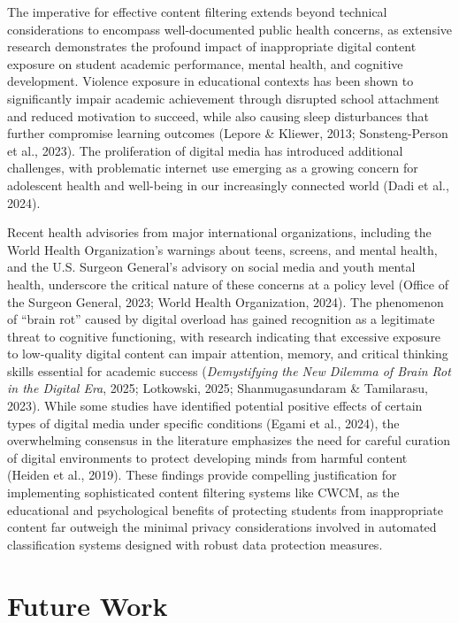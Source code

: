 \documentclass[
  titlepage]{article}
\begin{document}
The imperative for effective content filtering extends beyond technical
considerations to encompass well-documented public health concerns, as
extensive research demonstrates the profound impact of inappropriate
digital content exposure on student academic performance, mental health,
and cognitive development. Violence exposure in educational contexts has
been shown to significantly impair academic achievement through
disrupted school attachment and reduced motivation to succeed, while
also causing sleep disturbances that further compromise learning
outcomes (Lepore \& Kliewer, 2013; Sonsteng-Person et al., 2023). The
proliferation of digital media has introduced additional challenges,
with problematic internet use emerging as a growing concern for
adolescent health and well-being in our increasingly connected world
(Dadi et al., 2024).

Recent health advisories from major international organizations,
including the World Health Organization's warnings about teens, screens,
and mental health, and the U.S. Surgeon General's advisory on social
media and youth mental health, underscore the critical nature of these
concerns at a policy level (Office of the Surgeon General, 2023; World
Health Organization, 2024). The phenomenon of ``brain rot'' caused by
digital overload has gained recognition as a legitimate threat to
cognitive functioning, with research indicating that excessive exposure
to low-quality digital content can impair attention, memory, and
critical thinking skills essential for academic success
(\emph{Demystifying the New Dilemma of Brain Rot in the Digital Era},
2025; Lotkowski, 2025; Shanmugasundaram \& Tamilarasu, 2023). While some
studies have identified potential positive effects of certain types of
digital media under specific conditions (Egami et al., 2024), the
overwhelming consensus in the literature emphasizes the need for careful
curation of digital environments to protect developing minds from
harmful content (Heiden et al., 2019). These findings provide compelling
justification for implementing sophisticated content filtering systems
like CWCM, as the educational and psychological benefits of protecting
students from inappropriate content far outweigh the minimal privacy
considerations involved in automated classification systems designed
with robust data protection measures.

\section{Future Work}\label{future-work}
\end{document}
